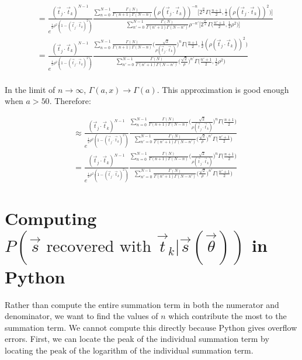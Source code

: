 \documentclass[12pt]{article}
\newcommand{\ptjtk}{\rho(\vec{t}_j\cdot\vec{t}_k)}
\newcommand{\tjtk}{(\vec{t}_j\cdot\vec{t}_k)}
\begin{document}
   \begin{align}
   &= \frac{\tjtk^{N-1}}{e^{\frac{1}{2}\rho^2(1-\tjtk^2)}} \frac{ \sum_{n=0}^{N-1} \frac{\Gamma(N)}{\Gamma(n+1)\Gamma(N-n)} (\ptjtk)^{-n} \Big[ 2^{\frac{n}{2}}\Gamma\Big(\frac{n+1}{2},\frac{1}{2}(\ptjtk)^2\Big) \Big]} 
   { \sum_{n'=0}^{N-1} \frac{\Gamma(N)}{\Gamma(n'+1)\Gamma(N-n')} \rho^{-n'}  \Big[ 2^{\frac{n'}{2}}\Gamma\Big(\frac{n'+1}{2},\frac{1}{2}\rho^2\Big) \Big] } \\
   &= \frac{\tjtk^{N-1}}{e^{\frac{1}{2}\rho^2(1-\tjtk^2)}} \frac{ \sum_{n=0}^{N-1} \frac{\Gamma(N)}{\Gamma(n+1)\Gamma(N-n)} \Big(\frac{\sqrt{2}}{\ptjtk}\Big)^{n} \Gamma\Big(\frac{n+1}{2},\frac{1}{2}(\ptjtk)^2\Big) } 
   { \sum_{n'=0}^{N-1} \frac{\Gamma(N)}{\Gamma(n'+1)\Gamma(N-n')} \Big(\frac{\sqrt{2}}{\rho}\Big)^{n'} \Gamma\Big(\frac{n'+1}{2},\frac{1}{2}\rho^2\Big) } \\
   \end{align}
  
In the limit of $n \rightarrow \infty$, $\Gamma(a,x) \rightarrow \Gamma(a)$. This approximation is good enough when $a > 50$. Therefore:
   
   \begin{align}
   &\approx \frac{\tjtk^{N-1}}{e^{\frac{1}{2}\rho^2(1-\tjtk^2)}} \frac{ \sum_{n=0}^{N-1} \frac{\Gamma(N)}{\Gamma(n+1)\Gamma(N-n)} \Big(\frac{\sqrt{2}}{\ptjtk}\Big)^{n} \Gamma\Big(\frac{n+1}{2}\Big) } 
   { \sum_{n'=0}^{N-1} \frac{\Gamma(N)}{\Gamma(n'+1)\Gamma(N-n')} \Big(\frac{\sqrt{2}}{\rho}\Big)^{n'} \Gamma\Big(\frac{n'+1}{2}\Big) } \\
   &= \frac{\tjtk^{N-1}}{e^{\frac{1}{2}\rho^2(1-\tjtk^2)}} \frac{ \sum_{n=0}^{N-1} \frac{\Gamma(N)}{\Gamma(n+1)\Gamma(N-n)} \Big(\frac{\sqrt{2}}{\ptjtk}\Big)^{n} \Gamma\Big(\frac{n+1}{2}\Big) } 
   { \sum_{n'=0}^{N-1} \frac{\Gamma(N)}{\Gamma(n'+1)\Gamma(N-n')} \Big(\frac{\sqrt{2}}{\rho}\Big)^{n'} \Gamma\Big(\frac{n'+1}{2}\Big) }
   \end{align}
   
\section{Computing $P(\text{$\vec{s}$ recovered with $\vec{t}_k$}|\vec{s}(\vec\theta))$ in Python}
   
Rather than compute the entire summation term in both the numerator and denominator, we want to find the values of $n$ which contribute the most to the summation term. We cannot compute this directly because Python gives overflow errors. First, we can locate the peak of the individual summation term by locating the peak of the logarithm of the individual summation term.
\end{document}

